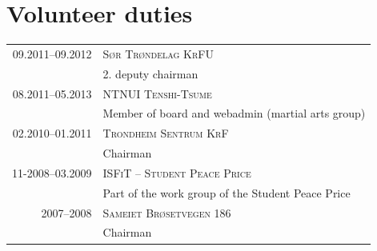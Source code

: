 \documentclass[a4paper,10pt]{article}
\begin{document}

\section{Volunteer duties}
\begin{longtable}{r|p{11cm}}

\textsc{09.2011--09.2012} & \textsc{Sør Trøndelag KrFU} \\
& \footnotesize{2. deputy chairman} \\

\textsc{08.2011--05.2013} & \textsc{NTNUI Tenshi-Tsume} \\
& \footnotesize{Member of board and webadmin (martial arts group)} \\



\textsc{02.2010--01.2011} & \textsc{Trondheim Sentrum KrF} \\
& \footnotesize{Chairman} \\


\textsc{11-2008--03.2009} & \textsc{ISFiT -- Student Peace Price} \\
& \footnotesize{Part of the work group of the Student Peace Price} \\

\textsc{2007--2008} & \textsc{Sameiet Brøsetvegen 186} \\
& \footnotesize{Chairman}\\




\end{longtable}
\end{document}
